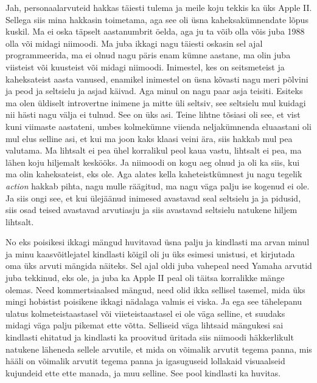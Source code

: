 
Jah, personaalarvuteid hakkas täiesti tulema ja meile koju tekkis ka üks Apple 
II. Sellega siis mina hakkasin toimetama, aga see oli 
üsna  kaheksakümnendate lõpus kuskil. Ma ei oska täpselt aastanumbrit öelda, 
aga ju ta võib olla võis juba 1988 olla või midagi niimoodi. Ma juba ikkagi  
nagu täiesti oskasin sel ajal programmeerida, ma ei olnud nagu päris enam kümne 
aastane, ma olin juba viisteist või kuusteist või midagi niimoodi. Inimestel, 
kes on seitsmeteist ja kaheksateist aasta vanused, enamikel inimestel on üsna 
kõvasti nagu meri põlvini  ja peod ja seltsielu ja asjad käivad. Aga minul on 
nagu paar asja teisiti. Esiteks ma olen üldiselt introvertne inimene ja mitte 
üli seltsiv, see seltsielu mul kuidagi nii hästi nagu välja ei tulnud. See on 
üks asi. Teine lihtne tõsiasi oli see, et vist kuni viimaste aastateni, umbes 
kolmekümne viienda neljakümnenda eluaastani oli mul elus selline asi, et kui ma 
joon kaks klaasi veini ära, siis hakkab mul pea valutama. Ma lihtsalt ei pea 
ühel  korralikul peol kaua vastu, lihtsalt ei pea,   ma lähen koju hiljemalt 
keskööks. Ja niimoodi on  kogu aeg olnud ja oli ka siis, kui ma olin 
kaheksateist, eks ole. Aga alates kella kaheteistkümnest ju nagu tegelik 
\emph{action} hakkab pihta, nagu mulle räägitud, ma nagu väga palju ise kogenud 
ei ole. Ja siis ongi see, et kui  ülejäänud inimesed avastavad seal seltsielu 
ja ja pidusid, siis osad teised avastavad arvutiasju ja siis avastavad 
seltsielu natukene hiljem lihtsalt.


No eks poisikesi ikkagi mängud huvitavad üsna palju ja kindlasti ma arvan  
minul ja minu kaasvõitlejatel kindlasti kõigil oli ju üks esimesi unistusi, et 
kirjutada oma üks arvuti mängida näiteks. Sel ajal oldi juba vahepeal need 
Yamaha arvutid juba tekkinud, eks ole, ja juba ka Apple II peal oli täitsa 
korralikke  mänge olemas. Need kommertsiaalsed mängud, need olid ikka sellisel 
tasemel, mida üks mingi hobistist poisikene ikkagi nädalaga valmis ei viska. Ja 
ega see tähelepanu ulatus  kolmeteistaastasel või viieteistaastasel ei ole väga 
selline, et suudaks midagi väga palju pikemat ette võtta. Selliseid väga 
lihtsaid mängukesi sai kindlasti ehitatud ja kindlasti ka proovitud üritada 
siis niimoodi häkkerlikult natukene läheneda sellele arvutile, et mida on 
võimalik arvutit tegema panna, mis hääli on võimalik arvutit tegema panna ja  
igasuguseid lollakaid visuaalseid kujundeid ette ette manada, ja muu selline. 
See pool kindlasti ka huvitas. 


